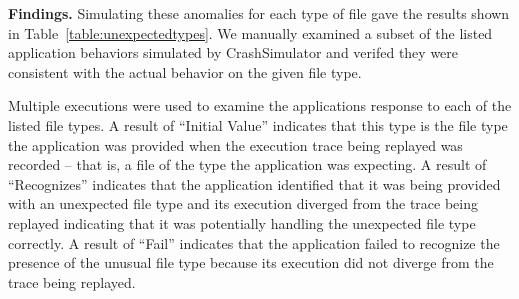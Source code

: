 
{\bf Findings.}
Simulating these anomalies for each type of file
gave the results shown in Table~\ref{table:unexpectedtypes}. 
We manually examined a subset of the listed application behaviors simulated by
CrashSimulator and verifed they were consistent with the actual behavior on the
given file type.


Multiple executions were used to examine the applications response to each of
the listed file types.  A result of ``Initial Value''
indicates that this type is the file type the application was provided when the
execution trace being replayed was recorded -- that is, a file of the type the
application was expecting.  A result of ``Recognizes'' indicates that the
application identified that it was being provided with an unexpected file type
and its execution diverged from the trace being replayed indicating that it was
potentially handling the unexpected file type correctly.  A result of ``Fail''
indicates that the application failed to recognize the presence of the unusual
file type because its execution did not diverge from the trace being replayed.


